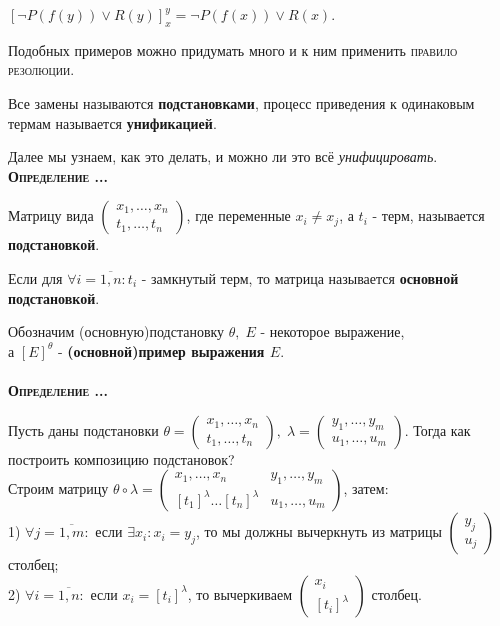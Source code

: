 \documentclass[18pt, a4paper]{extarticle}
\newcounter{par}
\newcounter{spar}
\newcounter{zap}
\newcommand{\opr}{\textbf{\textsc{Определение \thepar.\if\thespar1\thespar.\fi\thezap.\;}}\stepcounter{zap}}
\newcommand{\ovl}[1]{\overline{#1}}
\newcommand{\lot}[3]{#1_#2,\dots,#1_#3}
\begin{document}
$[\lnot P(f(y))\vee R(y)]^y_x=\lnot P(f(x))\vee R(x)$.

Подобных примеров можно придумать много и к ним применить \textsc{правило резолюции}.

Все замены называются \textbf{подстановками}, процесс приведения к одинаковым термам называется \textbf{унификацией}.

Далее мы узнаем, как это делать, и можно ли это всё \textit{унифицировать}.\\

\opr 

Матрицу вида $\begin{pmatrix}\lot x 1 n\\ \lot t 1 n\end{pmatrix}$, где переменные $x_i\neq x_j$, а $t_i$ - терм, называется \textbf{подстановкой}. 

Если для $\forall i=\ovl{1,n}\!:t_i$ - замкнутый терм, то матрица называется \textbf{основной подстановкой}.

Обозначим (основную)подстановку $\theta,\;E$ - некоторое выражение, \\
а $[E]^\theta$ - \textbf{(основной)пример выражения $E$}.\\\\

\opr 

Пусть даны подстановки $\theta=\begin{pmatrix}\lot x 1 n\\ \lot t 1 n\end{pmatrix},\;\lambda=\begin{pmatrix}\lot y 1 m\\ \lot u 1 m\end{pmatrix}$. Тогда как построить композицию подстановок? \\
Строим матрицу $\theta\circ\lambda=\begin{pmatrix}\lot x 1 n & \lot y 1 m\\ [t_1]^\lambda\dots[t_n]^\lambda & \lot u 1 m\end{pmatrix}$, затем:\\
1) $\forall j=\ovl{1,m}\!:$ если $\exists x_i\!\!:x_i=y_j$, то мы должны вычеркнуть из матрицы $\begin{pmatrix}y_j\\u_j\end{pmatrix}$ столбец; \\
2) $\forall i=\ovl{1,n}\!:$ если $x_i=[t_i]^\lambda$, то вычеркиваем $\begin{pmatrix}x_i\\{[t_i]^\lambda}\end{pmatrix}$ столбец. 
\end{document}
